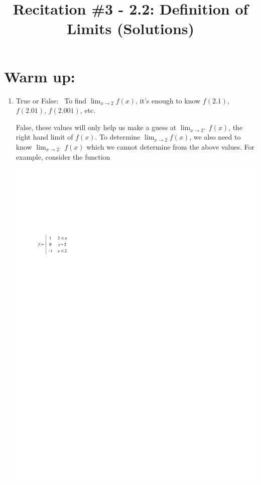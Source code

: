 \documentclass[nooutcomes]{ximera}
\title{Recitation \#3 - 2.2:  Definition of Limits (Solutions)}
\begin{document}
\begin{abstract}		\end{abstract}
\maketitle

\section*{Warm up:} 

	\begin{enumerate}[label=(\alph*)]
	
	\item  True or False: \, To find $\lim_{x \to 2} f(x)$, it's enough to know $f(2.1)$, $f(2.01)$, $f(2.001)$, etc.
	\begin{freeResponse}
	 False, these values will only help us make a guess at $\lim_{x \to 2^+} f(x)$, the right hand limit of $f(x)$.  To determine $\lim_{x \to 2} f(x)$, we also need to know $\lim_{x \to 2^-} f(x)$ which we cannot determine from the above values.  For example, consider the function
	 	\begin{image}
	 	\includegraphics[trim= 70 570 300 165]{Figure2.pdf}
	 	\end{image}
	 	

\end{freeResponse}
\end{enumerate}
\end{document}
